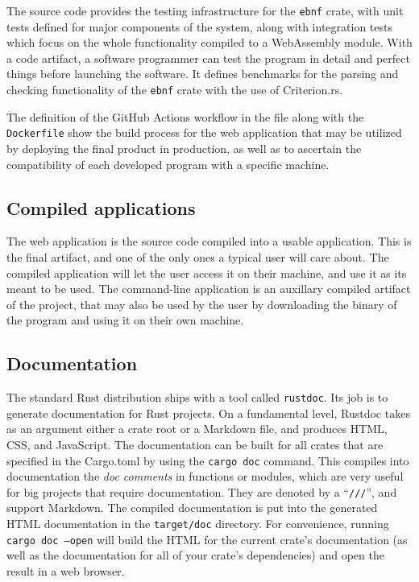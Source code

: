 \documentclass[english,engineering]{wizthesis}
\begin{document}
The source code provides the testing infrastructure for the \texttt{ebnf} crate,
with unit tests defined for major components of the system, along with
integration tests which focus on the whole functionality compiled to a
WebAssembly module. With a code artifact, a software programmer can test the
program in detail and perfect things before launching the software. It defines
benchmarks for the parsing and checking functionality of the \texttt{ebnf} crate
with the use of Criterion.rs.

The definition of the GitHub Actions workflow in the  file along
with the \texttt{Dockerfile} show the build process for the web application that
may be utilized by deploying the final product in production, as well as to
ascertain the compatibility of each developed program with a specific machine.

\subsection*{Compiled applications}

The web application is the source code compiled into a usable application. This
is the final artifact, and one of the only ones a typical user will care about.
The compiled application will let the user access it on their machine, and use
it as its meant to be used. The command-line application is an auxillary
compiled artifact of the project, that may also be used by the user by
downloading the binary of the program and using it on their own machine.

\subsection*{Documentation}

The standard Rust distribution ships with a tool called \texttt{rustdoc}. Its
job is to generate documentation for Rust projects. On a fundamental level,
Rustdoc takes as an argument either a crate root or a Markdown file, and
produces HTML, CSS, and JavaScript. The documentation can be built for all
crates that are specified in the Cargo.toml by using the \texttt{cargo doc}
command. This compiles into documentation the \emph{doc comments} in functions
or modules, which are very useful for big projects that require documentation.
They are denoted by a ``\texttt{///}'', and support Markdown. The compiled documentation
is put into the generated HTML documentation in the \texttt{target/doc}
directory. For convenience, running \texttt{cargo doc --open} will build the
HTML for the current crate's documentation (as well as the documentation for
all of your crate's dependencies) and open the result in a web browser.
\end{document}
